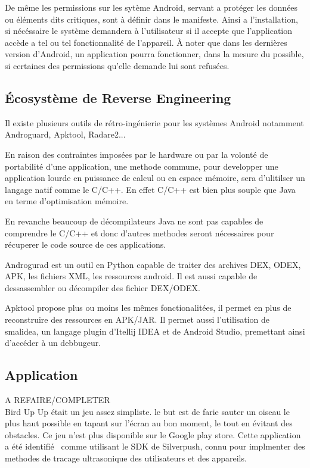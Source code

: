 \documentclass[12pt]{article}
\begin{document}
De même les permissions sur les sytème Android, servant a protéger les données ou éléments dits critiques, sont à définir dans le manifeste. Ainsi a l'installation, si nécéssaire le système demandera à l'utilisateur si il accepte que l'application accède a tel ou tel fonctionnalité de l'appareil. À noter que dans les dernières version d'Android, un application pourra fonctionner, dans la mesure du possible, si certaines des permissions qu'elle demande lui sont refusées.

\subsection{Écosystème de Reverse Engineering}
Il existe plusieurs outils de rétro-ingénierie pour les systèmes Android notamment Androguard, Apktool, Radare2...

En raison des contraintes imposées par le hardware ou par la volonté de portabilité d'une application, une methode commune, pour developper une application lourde en puissance de calcul ou en espace mémoire, sera d'ulitilser un langage natif comme le C/C++. En effet C/C++ est bien plus souple que Java en terme d'optimisation mémoire.

En revanche beaucoup de décompilateurs Java ne sont pas capables de comprendre le C/C++ et donc d'autres methodes seront nécessaires pour récuperer le code source de ces applications.

Androgurad est un outil en Python capable de traiter des archives DEX, ODEX, APK, les fichiers XML, les ressources android. Il est aussi capable de dessassembler ou décompiler des fichier DEX/ODEX.

Apktool propose plus ou moins les mêmes fonctionalitées, il permet en plus de reconstruire des ressources en APK/JAR. Il permet aussi l'utilisation de smalidea, un langage plugin d'Itellij IDEA et de Android Studio, premettant ainsi d'accéder à un debbugeur.


\subsection{Application}

A REFAIRE/COMPLETER\\

\og Bird Up Up \fg{} était un jeu assez simpliste. le but est de farie sauter un oiseau le plus haut possible en tapant sur l'écran au bon moment, le tout en évitant des obstacles. Ce jeu n'est plus disponible sur le Google play store.
Cette application a été identifié~\cite{silverpushunmasked} comme utilisant le SDK de Silverpush, connu pour implmenter des methodes de tracage ultrasonique des utilisateurs et des appareils.
\end{document}
